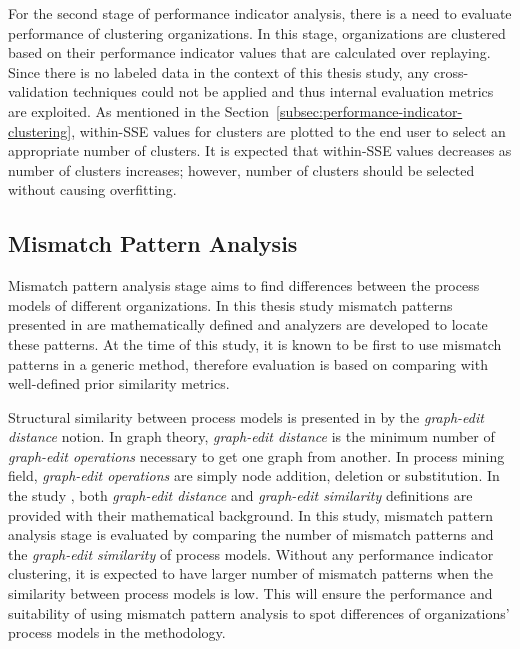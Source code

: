 For the second stage of performance indicator analysis, there is a need to evaluate performance of clustering organizations. In this stage, organizations are clustered  based on their performance indicator values that are calculated over replaying. Since there is no labeled data in the context of this thesis study, any cross-validation techniques could not be applied and thus internal evaluation metrics are exploited. As mentioned in the Section~\ref{subsec:performance-indicator-clustering}, within-SSE values for clusters are plotted to the end user to select an appropriate number of clusters. It is expected that within-SSE values decreases as number of clusters increases; however, number of clusters should be selected without causing overfitting.

\subsection{Mismatch Pattern Analysis}
\label{subsec:mismatch-pattern-analysis-eval}
Mismatch pattern analysis stage aims to find differences between the process models of different organizations. In this thesis study mismatch patterns presented in \cite{dijkman2007mismatch} are mathematically defined and analyzers are developed to locate these patterns. At the time of this study, it is known to be first to use mismatch patterns in a generic method, therefore evaluation is based on comparing with well-defined prior similarity metrics.

Structural similarity between process models is presented in \cite{dijkman2011similarity} by the \textit{graph-edit distance} notion. In graph theory, \textit{graph-edit distance} is the minimum number of \textit{graph-edit operations} necessary to get one graph from another. In process mining field, \textit{graph-edit operations} are simply node addition, deletion or substitution. In the study \cite{dijkman2011similarity}, both \textit{graph-edit distance} and \textit{graph-edit similarity} definitions are provided with their mathematical background. In this study, mismatch pattern analysis stage is evaluated by comparing the number of mismatch patterns and the \textit{graph-edit similarity} of process models. Without any performance indicator clustering, it is expected to have larger number of mismatch patterns when the similarity between process models is low. This will ensure the performance and suitability of using mismatch pattern analysis to spot differences of organizations' process models in the methodology.
